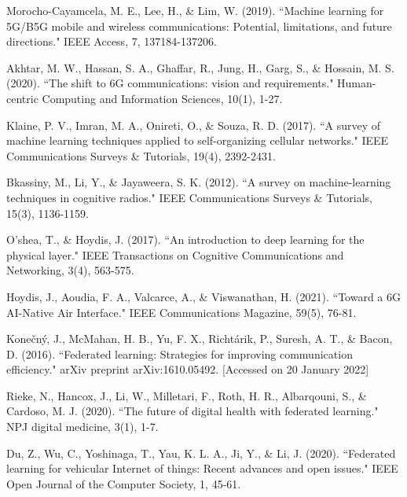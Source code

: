 \documentclass[10pt,a4paper,twocolumn]{article}
\begin{document}

\begin{thebibliography}{9}
	
 Morocho-Cayamcela, M. E., Lee, H., \& Lim, W. (2019). ``Machine learning for 5G/B5G mobile and wireless communications: Potential, limitations, and future directions." IEEE Access, 7, 137184-137206.

 Akhtar, M. W., Hassan, S. A., Ghaffar, R., Jung, H., Garg, S., \& Hossain, M. S. (2020). ``The shift to 6G communications: vision and requirements." Human-centric Computing and Information Sciences, 10(1), 1-27.		

 Klaine, P. V., Imran, M. A., Onireti, O., \& Souza, R. D. (2017). ``A survey of machine learning techniques applied to self-organizing cellular networks." IEEE Communications Surveys \& Tutorials, 19(4), 2392-2431.

 Bkassiny, M., Li, Y., \& Jayaweera, S. K. (2012). ``A survey on machine-learning techniques in cognitive radios." IEEE Communications Surveys \& Tutorials, 15(3), 1136-1159.

 O’shea, T., \& Hoydis, J. (2017). ``An introduction to deep learning for the physical layer." IEEE Transactions on Cognitive Communications and Networking, 3(4), 563-575.

 Hoydis, J., Aoudia, F. A., Valcarce, A., \& Viswanathan, H. (2021). ``Toward a 6G AI-Native Air Interface." IEEE Communications Magazine, 59(5), 76-81.

 Konečný, J., McMahan, H. B., Yu, F. X., Richtárik, P., Suresh, A. T., \& Bacon, D. (2016). ``Federated learning: Strategies for improving communication efficiency." arXiv preprint arXiv:1610.05492. [Accessed on 20 January 2022] 

 Rieke, N., Hancox, J., Li, W., Milletari, F., Roth, H. R., Albarqouni, S., \& Cardoso, M. J. (2020). ``The future of digital health with federated learning." NPJ digital medicine, 3(1), 1-7.

 Du, Z., Wu, C., Yoshinaga, T., Yau, K. L. A., Ji, Y., \& Li, J. (2020). ``Federated learning for vehicular Internet of things: Recent advances and open issues." IEEE Open Journal of the Computer Society, 1, 45-61.


\end{thebibliography}
\end{document}
